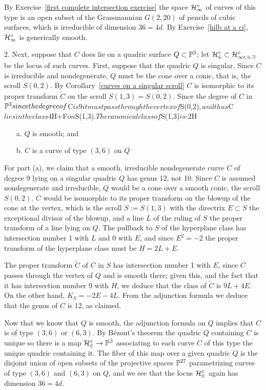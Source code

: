 By Exercise~\ref{first complete intersection exercise} the space $\cal H^\circ_1$ of curves of this type is an open subset of the Grassmannian $G(2,20)$ of pencils of cubic surfaces, which is irreducible of dimension $36 = 4d$. By Exercise~\ref{hilb at a ci}, $\cal H^\circ_1$ is generically smooth.

2. Next, suppose that $C$ does lie on a quadric surface $Q \subset {\mathbb P}^3$; let $\cal H^\circ_2 \subset \cal H^\circ_{10,3,9}$ be the locus of such curves. First, suppose that the quadric $Q$ is singular. Since $C$ is irreducible and nondegenerate,
$Q$ must be the cone over a conic, that is, the scroll $S(0,2)$.
By Corollary~\ref{curves on a singular scroll}
$C$ is isomorphic to its proper transform $\widetilde C$ on the scroll $S(1,3) = \widetilde{S(0,2)}$. Since the degree of
$C$ in ${\mathbb P}^{3}
since the degree of $C$ is 9 it must pass through the vertex of $S(0,2)$,  and thus $\widetilde C$ lies 
in the class $4H+F$ on $S(1,3)$. The canonical class of $S(1,3)$ is $-2H

\begin{enumerate}
\item[a.] $Q$ is smooth; and
\item[b.] $C$ is a curve of type $(3,6)$ on $Q$
\end{enumerate}

For part (a), we claim that a smooth, irreducible nondegenerate curve $C$ of degree 9 lying on a singular quadric $Q$ has  genus 12, not 10. Since $C$ is assumed nondegenerate and irreducible, $Q$ would be a cone over a smooth conic, 
the scroll $S(0,2)$. $C$ would be isomorphic to its proper transform on the blowup of the cone at the vertex,
which is the scroll $S:= S(1,3)$ with the directrix $E \subset S$ the exceptional divisor of the blowup, and a line $L$ of the ruling of $S$ the proper transform of a line lying on $Q$. The pullback to $S$ of the hyperplane class has intersection number 1 with $L$ and 0 with $E$, and since $E^2 =-2$ the proper transform of the hyperplane class must  be $H = 2L + E$.

The proper transform $\widetilde C$ of $C$ in $S$ has intersection number 1 with $E$, since $C$ passes through the vertex of $Q$ and is smooth there; given this, and the fact that it has intersection number 9 with $H$, we deduce that the class of $\widetilde C$ is $9L + 4E$. On the other hand, $K_{S} = -2E - 4L$. From the adjunction formula we deduce that  the genus of $C$ is 12, as claimed.

Now that we know that $Q$ is smooth, the adjunction formula on $Q$ implies that $C$ is of type $(3,6)$ or $(6,3)$. 
By B\'ezout's theorem the quadric $Q$ containing $C$ is unique so there is a map $\cal H^\circ_2 \to {\mathbb P}^9$ associating to each curve $C$ of this type the unique quadric containing it. The fiber of this map over a given quadric $Q$ is the disjoint union of open subsets of the projective spaces ${\mathbb P}^{27}$ parametrizing curves of type $(3,6)$ and $(6,3)$ on $Q$, and we see that the locus $\cal H^\circ_2$ again has dimension $36 = 4d$. 

